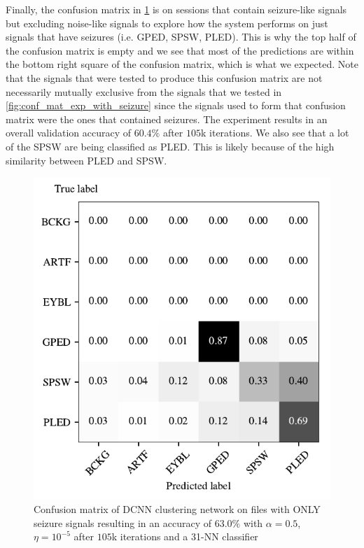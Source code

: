Finally, the confusion matrix in \cref{fig:conf_mat_exp_with_only_seizure} is on sessions that contain seizure-like signals but excluding noise-like signals to explore how the system performs on just signals that have seizures (i.e. GPED, SPSW, PLED). This is why the top half of the confusion matrix is empty and we see that most of the predictions are within the bottom right square of the confusion matrix, which is what we expected. Note that the signals that were tested to produce this confusion matrix are not necessarily mutually exclusive from the signals that we tested in \cref{fig:conf_mat_exp_with_seizure} since the signals used to form that confusion matrix were the ones that contained seizures. The experiment results in an overall validation accuracy of $60.4\%$ after $105$k iterations. We also see that a lot of the SPSW are being classified as PLED. This is likely because of the high similarity between PLED and SPSW.

\begin{figure}[!ht]
	\centering
	\includegraphics[width=0.55\linewidth]{pictures/conf_mat_exp_with_only_seizure.pdf}
	\caption[Confusion Matrix on Sessions with only Seizure-Like Signals]{Confusion matrix of DCNN clustering network on files with ONLY seizure signals resulting in an accuracy of $63.0\%$ with $\alpha = 0.5$, $\eta = 10^{-5}$ after $105$k iterations and a 31-NN classifier}\label{fig:conf_mat_exp_with_only_seizure}  
\end{figure}

